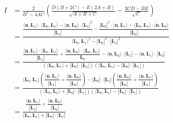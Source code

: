 \begin{align*}
I &= \frac{2}{B^2-4AC}\left(\frac{D(B + 2C) - E(2A+B)}{\sqrt{A+B+C}} - \frac{2CD - BE}{\sqrt{C}}\right)\\
&= \frac{ \dfrac{\langle\mathbf{n},\mathbf{L}_1\rangle\cdot\langle\mathbf{L}_0,\mathbf{L}_1\rangle - \langle\mathbf{n},\mathbf{L}_0\rangle\cdot|\mathbf{L}_1|^2}{|\mathbf{L}_1|} - \dfrac{|\mathbf{L}_0|^2\cdot\langle\mathbf{n},\mathbf{L}_1\rangle - \langle\mathbf{L}_0,\mathbf{L}_1\rangle\cdot\langle\mathbf{n},\mathbf{L}_0\rangle}{|\mathbf{L}_0|} }{\langle\mathbf{L}_0,\mathbf{L}_1\rangle^2-|\mathbf{L}_0|^2\cdot|\mathbf{L}_1|^2}\\
&= \frac{  \dfrac{\langle\mathbf{n},\mathbf{L}_1\rangle\cdot\langle\mathbf{L}_0,\mathbf{L}_1\rangle}{|\mathbf{L}_1|} + \dfrac{\langle\mathbf{n},\mathbf{L}_0\rangle\cdot\langle\mathbf{L}_0,\mathbf{L}_1\rangle}{\mathbf{L}_0} - \langle\mathbf{n},\mathbf{L}_0\rangle\cdot|\mathbf{L}_1| - \langle\mathbf{n},\mathbf{L}_1\rangle\cdot|\mathbf{L}_0|}{(\langle\mathbf{L}_0,\mathbf{L}_1\rangle+|\mathbf{L}_0|\cdot|\mathbf{L}_1|)(\langle\mathbf{L}_0,\mathbf{L}_1\rangle-|\mathbf{L}_0|\cdot|\mathbf{L}_1|)} \\
&= \frac{\langle\mathbf{L}_0,\mathbf{L}_1\rangle\left(\dfrac{\langle\mathbf{n},\mathbf{L}_1\rangle}{|\mathbf{L}_1|}+\dfrac{\langle\mathbf{n},\mathbf{L}_0\rangle}{|\mathbf{L}_0|}\right) - |\mathbf{L}_0|\cdot|\mathbf{L}_1|\left(\dfrac{\langle\mathbf{n},\mathbf{L}_0\rangle}{|\mathbf{L}_0|}+\dfrac{\langle\mathbf{n},\mathbf{L}_1\rangle}{|\mathbf{L}_1|}\right)}{(\langle\mathbf{L}_0,\mathbf{L}_1\rangle+|\mathbf{L}_0|\cdot|\mathbf{L}_1|)(\langle\mathbf{L}_0,\mathbf{L}_1\rangle-|\mathbf{L}_0|\cdot|\mathbf{L}_1|)} \\
&= \frac{\dfrac{\langle\mathbf{n},\mathbf{L}_1\rangle}{|\mathbf{L}_1|}+\dfrac{\langle\mathbf{n},\mathbf{L}_0\rangle}{|\mathbf{L}_0|} }{\langle\mathbf{L}_0,\mathbf{L}_1\rangle + |\mathbf{L}_0|\cdot|\mathbf{L}_1|}
\end{align*}


\newpage

